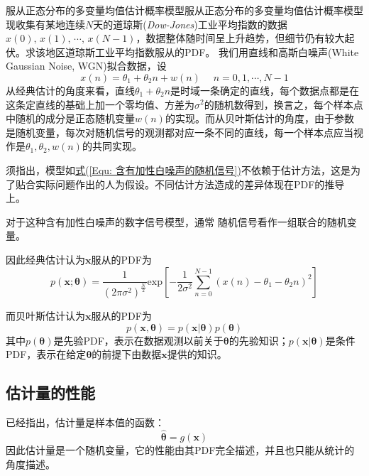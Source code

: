         \begin{example}{服从正态分布的多变量均值估计概率模型}{服从正态分布的多变量均值估计概率模型}
            现收集有某地连续$N$天的道琼斯(\emph{Dow-Jones})工业平均指数的数据$x(0),\,x(1),\,\cdots,\,x(N-1)$，数据整体随时间呈上升趋势，但细节仍有较大起伏。求该地区道琼斯工业平均指数服从的PDF。
            \setlength{\parindent}{2\ccwd}
            我们用直线和高斯白噪声(White Gaussian Noise, WGN)拟合数据，设
            \begin{equation}\label{Equ: 含有加性白噪声的随机信号}
                x(n)=\theta_1+\theta_2n+w(n) \;\quad n=0,1,\cdots,N-1
            \end{equation}
            从经典估计的角度来看，直线$\theta_1+\theta_2n$是时域一条确定的直线，每个数据点都是在这条定直线的基础上加一个零均值、方差为$\sigma^2$的随机数得到，换言之，每个样本点中随机的成分是正态随机变量$w(n)$的实现。而从贝叶斯估计的角度，由于参数是随机变量，每次对随机信号的观测都对应一条不同的直线，每一个样本点应当视作是$\theta_1,\theta_2,w(n)$的共同实现。

            须指出，模型如\hyperref[Equ: 含有加性白噪声的随机信号]{式(\ref*{Equ: 含有加性白噪声的随机信号})}不依赖于估计方法，这是为了贴合实际问题作出的人为假设。不同估计方法造成的差异体现在PDF的推导上。

            对于这种含有加性白噪声的数字信号模型，通常%
            随机信号看作一组联合的随机变量。
            
            因此经典估计认为$\bm{x}$服从的PDF为
            \begin{equation}
                p(\bm{x};\bm{\theta})=\frac{1}{(2\pi\sigma^2)^{\frac{N}{2}}}\mathrm{exp}\left[-\frac{1}{2\sigma^2}\sum_{n=0}^{N-1}(x(n)-\theta_1-\theta_2n)^2\right]
            \end{equation}
            
            而贝叶斯估计认为$\bm{x}$服从的PDF为
            \begin{equation}
                p(\bm{x},\bm{\theta})=p(\bm{x}|\bm{\theta})p(\bm{\theta})
            \end{equation}
            其中$p(\bm{\theta})$是先验PDF，表示在数据观测以前关于$\bm{\theta}$的先验知识；$p(\bm{x}|\bm{\theta})$是条件PDF，表示在给定$\bm{\theta}$的前提下由数据$\bm{x}$提供的知识。
        \end{example}

    \subsection{估计量的性能}
        已经指出，估计量是样本值的函数：
        \begin{equation*}
            \hat{\bm{\theta}}=g(\bm{x})
        \end{equation*}
        因此估计量是一个随机变量，它的性能由其PDF完全描述，并且也只能从统计的角度描述。

